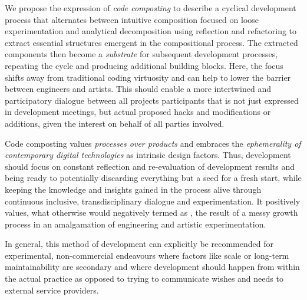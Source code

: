 We propose the expression of \emph{code composting} to describe a cyclical development process that alternates between intuitive composition focused on loose experimentation and analytical decomposition using reflection and refactoring to extract essential structures emergent in the compositional process.
The extracted components then become a \emph{substrate} for subsequent development processes, repeating the cycle and producing additional building blocks.
Here, the focus shifts away from traditional coding virtuosity and can help to lower the barrier between engineers and artists.
This should enable a more intertwined and participatory dialogue between all project\textquotesingle s participants that is not just expressed in development meetings, but actual proposed hacks and modifications or additions, given the interest on behalf of all parties involved.

Code composting values \emph{processes over products} and embraces the \emph{ephemerality of contemporary digital technologies} as intrinsic design factors.
Thus, development should focus on constant reflection and re-evaluation of development results and being ready to potentially discarding everything but a seed for a fresh start, while keeping the knowledge and insights gained in the process alive through continuous inclusive, transdisciplinary dialogue and experimentation.
It positively values, what otherwise would negatively termed as , the result of a messy growth process in an amalgamation of engineering and artistic experimentation.

In general, this method of development can explicitly be recommended for experimental, non-commercial endeavours where factors like scale or long-term maintainability are secondary and where development should happen from within the actual practice as opposed to trying to communicate wishes and needs to external service providers.
